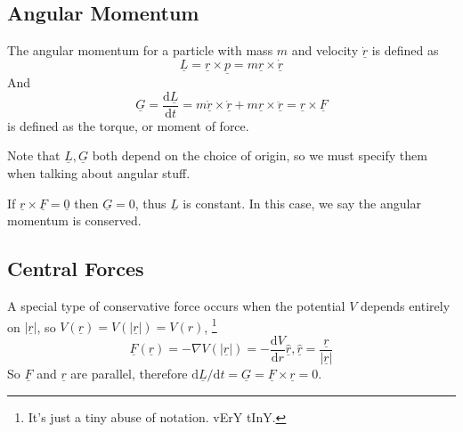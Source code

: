 \subsection{Angular Momentum}
\begin{definition}
    The angular momentum for a particle with mass $m$ and velocity $\underline{\dot{r}}$ is defined as
    $$\underline{L}=\underline{r}\times\underline{p}=m\underline{r}\times\underline{\dot{r}}$$
    And
    $$\underline{G}=\frac{\mathrm d\underline{L}}{\mathrm dt}=m\underline{\dot{r}}\times\underline{\dot{r}}+m\underline{r}\times\underline{\ddot{r}}=\underline{r}\times\underline{F}$$
    is defined as the torque, or moment of force.
\end{definition}
Note that $\underline{L},\underline{G}$ both depend on the choice of origin, so we must specify them when talking about angular stuff.
\begin{remark}
    If $\underline{r}\times\underline{F}=\underline{0}$ then $\underline{G}=0$, thus $\underline{L}$ is constant.
    In this case, we say the angular momentum is conserved.
\end{remark}
\subsection{Central Forces}
A special type of conservative force occurs when the potential $V$ depends entirely on $|\underline{r}|$, so $V(\underline{r})=V(|\underline{r}|)=V(r)$,
\footnote{It's just a tiny abuse of notation. vErY tInY.}
$$\underline{F}(\underline{r})=-\nabla V(|\underline{r}|)=-\frac{\mathrm dV}{\mathrm dr}\underline{\hat{r}},\underline{\hat{r}}=\frac{\underline{r}}{|\underline{r}|}$$
So $\underline{F}$ and $\underline{r}$ are parallel, therefore $\mathrm d\underline{L}/\mathrm dt=\underline{G}=\underline{F}\times\underline{r}=0$.
